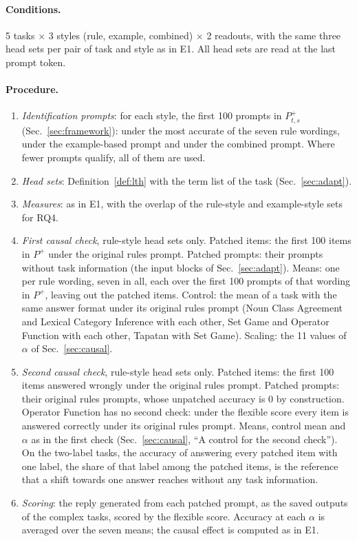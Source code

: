 \documentclass[11pt,a4paper]{article}
\begin{document}
\paragraph{Conditions.} 5 tasks $\times$ 3 styles (rule, example, combined) $\times$ 2 readouts, with the same three head sets per pair of task and style as in E1. All head sets are read at the last prompt token.

\paragraph{Procedure.}
\begin{enumerate}
\item \emph{Identification prompts}: for each style, the first 100 prompts in $P^{+}_{t,s}$ (Sec.~\ref{sec:framework}): under the most accurate of the seven rule wordings, under the example-based prompt and under the combined prompt. Where fewer prompts qualify, all of them are used.
\item \emph{Head sets}: Definition~\ref{def:lth} with the term list of the task (Sec.~\ref{sec:adapt}).
\item \emph{Measures}: as in E1, with the overlap of the rule-style and example-style sets for RQ4.
\item \emph{First causal check}, rule-style head sets only. Patched items: the first 100 items in $P^{+}$ under the original rules prompt. Patched prompts: their prompts without task information (the input blocks of Sec.~\ref{sec:adapt}). Means: one per rule wording, seven in all, each over the first 100 prompts of that wording in $P^{+}$, leaving out the patched items. Control: the mean of a task with the same answer format under its original rules prompt (Noun Class Agreement and Lexical Category Inference with each other, Set Game and Operator Function with each other, Tapatan with Set Game). Scaling: the 11 values of $\alpha$ of Sec.~\ref{sec:causal}.
\item \emph{Second causal check}, rule-style head sets only. Patched items: the first 100 items answered wrongly under the original rules prompt. Patched prompts: their original rules prompts, whose unpatched accuracy is 0 by construction. Operator Function has no second check: under the flexible score every item is answered correctly under its original rules prompt. Means, control mean and $\alpha$ as in the first check (Sec.~\ref{sec:causal}, ``A control for the second check''). On the two-label tasks, the accuracy of answering every patched item with one label, the share of that label among the patched items, is the reference that a shift towards one answer reaches without any task information.
\item \emph{Scoring}: the reply generated from each patched prompt, as the saved outputs of the complex tasks, scored by the flexible score. Accuracy at each $\alpha$ is averaged over the seven means; the causal effect is computed as in E1.
\end{enumerate}
\end{document}
